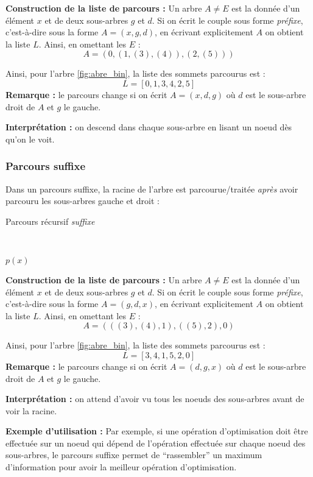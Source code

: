 \documentclass[../../../main.tex]{subfiles}
\begin{document}
\textbf{Construction de la liste de parcours :} Un arbre $A\neq E$ est la donnée d'un élément $x$ et de deux sous-arbres $g$ et $d$. Si on écrit le couple sous forme \textit{préfixe}, c'est-à-dire sous la forme $A = (x, g, d)$, en écrivant explicitement $A$ on obtient la liste $L$. Ainsi, en omettant les $E$ :
$$A = (0, (1, (3), (4)), (2, (5)))$$

Ainsi, pour l'arbre \ref{fig:abre_bin}, la liste des sommets parcourus est :
$$L = [0, 1, 3, 4, 2, 5]$$
\textbf{Remarque :} le parcours change si on écrit $A = (x, d, g)$ où $d$ est le sous-arbre droit de $A$ et $g$ le gauche.

\textbf{Interprétation :} on descend dans chaque sous-arbre en lisant un noeud dès qu'on le voit.
\subsubsection{Parcours suffixe}
Dans un parcours suffixe, la racine de l'arbre est parcourue/traitée \textit{après} avoir parcouru les sous-arbres gauche et droit :

\begin{algorithm}
\caption{Parcours récursif \textit{suffixe}\label{alg:arbre_parcours_suffixe}}
\Indm\nonl{} \\
\Indp
{} {
	 {
		
	}
	 {
		\;
		\;
		$p(x)$\;
	}
}
\end{algorithm}

\textbf{Construction de la liste de parcours :} Un arbre $A\neq E$ est la donnée d'un élément $x$ et de deux sous-arbres $g$ et $d$. Si on écrit le couple sous forme \textit{préfixe}, c'est-à-dire sous la forme $A = (g, d, x)$, en écrivant explicitement $A$ on obtient la liste $L$. Ainsi, en omettant les $E$ :
$$A = (((3), (4), 1), ((5), 2), 0)$$

Ainsi, pour l'arbre \ref{fig:abre_bin}, la liste des sommets parcourus est :
$$L = [3, 4, 1, 5, 2, 0]$$
\textbf{Remarque :} le parcours change si on écrit $A = (d, g, x)$ où $d$ est le sous-arbre droit de $A$ et $g$ le gauche.

\textbf{Interprétation :} on attend d'avoir vu tous les noeuds des sous-arbres avant de voir la racine.

\textbf{Exemple d'utilisation :} Par exemple, si une opération d'optimisation doit être effectuée sur un noeud qui dépend de l'opération effectuée sur chaque noeud des sous-arbres, le parcours suffixe permet de ``rassembler'' un maximum d'information pour avoir la meilleur opération d'optimisation.
\end{document}
